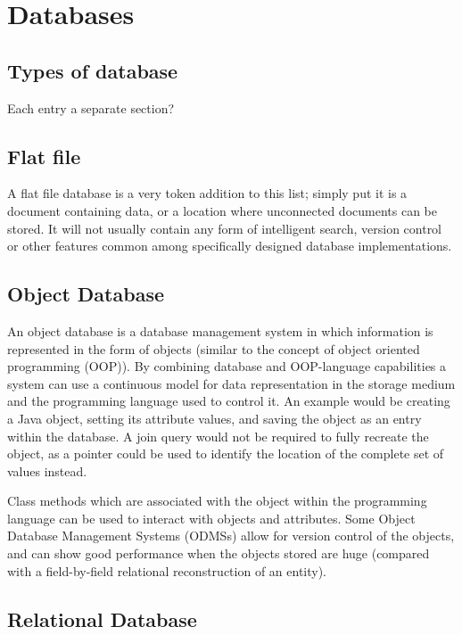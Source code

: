 \documentclass[12pt]{report}
\begin{document}
\chapter*{Databases}

\section*{Types of database}
Each entry a separate section?

\section*{Flat file}

A flat file database is a very token addition to this list; simply put it is a document containing data, or a location where unconnected documents can be stored. It will not usually contain any form of intelligent search, version control or other features common among specifically designed database implementations.

\section*{Object Database}

An object database is a database management system in which information is represented in the form of objects (similar to the concept of object oriented programming (OOP)). By combining database and OOP-language capabilities a system can use a continuous model for data representation in the storage medium and the programming language used to control it. An example would be creating a Java object, setting its attribute values, and saving the object as an entry within the database. A join query would not be required to fully recreate the object, as a pointer could be used to identify the location of the complete set of values instead.

Class methods which are associated with the object within the programming language can be used to interact with objects and attributes. Some Object Database Management Systems (ODMSs) allow for version control of the objects, and can show good performance when the objects stored are huge (compared with a field-by-field relational reconstruction of an entity).

\section*{Relational Database}
\end{document}
